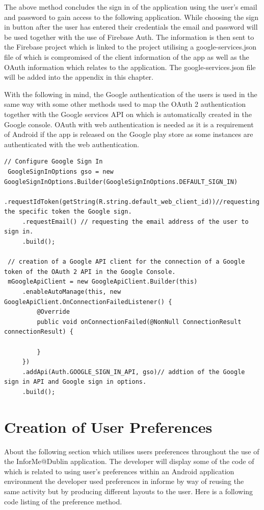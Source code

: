 The above method concludes the sign in of the application using the user's email and password to gain access to the following application. While choosing the sign in button after the user has entered their credentials the email and password will be used together with the use of Firebase Auth. The information is then sent to the Firebase project which is linked to the project utilising a google-services.json file of which is compromised of the client information of the app as well as the OAuth information which relates to the application. The google-services.json file will be added into the appendix in this chapter.
\par
With the following in mind, the  Google authentication of the users is used in the same way with some other methods used to map the OAuth 2 authentication together with the Google services API on which is automatically created in the Google console.  OAuth with web authentication is needed as it is a requirement of Android if the app is released on the Google play store as some instances are authenticated with the web authentication.
\newline

\begin{lstlisting}[style=myCustomMatlabStyle, basicstyle=\small, breaklines, caption=Google Authentication Example,captionpos=b] 
 // Configure Google Sign In
 GoogleSignInOptions gso = new GoogleSignInOptions.Builder(GoogleSignInOptions.DEFAULT_SIGN_IN)
     .requestIdToken(getString(R.string.default_web_client_id))//requesting the specific token the Google sign.
     .requestEmail() // requesting the email address of the user to sign in.
     .build();
 
 // creation of a Google API client for the connection of a Google token of the OAuth 2 API in the Google Console.
 mGoogleApiClient = new GoogleApiClient.Builder(this)
     .enableAutoManage(this, new GoogleApiClient.OnConnectionFailedListener() {
         @Override
         public void onConnectionFailed(@NonNull ConnectionResult connectionResult) {
         
         }
     })
     .addApi(Auth.GOOGLE_SIGN_IN_API, gso)// addtion of the Google sign in API and Google sign in options.
     .build();
 \end{lstlisting}

\section{Creation of User Preferences}
About the following section which utilises users preferences throughout the use of the InforMe@Dublin application. The developer will display some of the code of which is related to using user's preferences within an Android application environment the developer used preferences in informe by way of reusing the same activity but by producing different layouts to the user. Here is a following code listing of the preference method.

